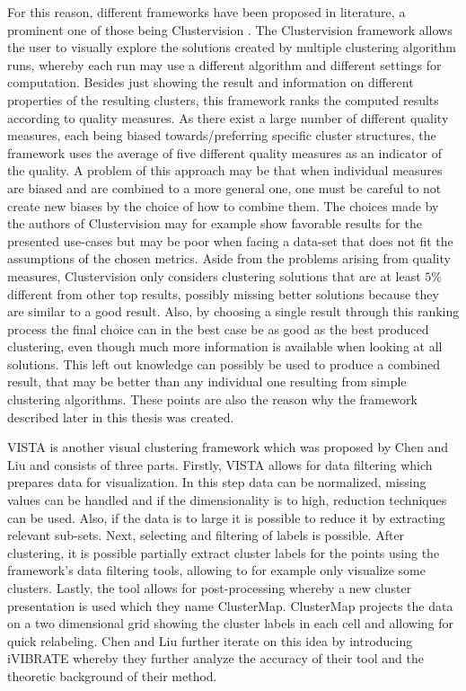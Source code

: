 \documentclass[
	a4paper,
	english,
	twoside,
	openright,               
	11pt                            
	]{report}
\begin{document}
For this reason, different frameworks have been proposed in literature, a prominent one of those being Clustervision \cite{Kwon2018ClustervisionVS}. The Clustervision framework allows the user to visually explore the solutions created by multiple clustering algorithm runs, whereby each run may use a different algorithm and different settings for computation. Besides just showing the result and information on different properties of the resulting clusters, this framework ranks the computed results according to quality measures. As there exist a large number of different quality measures, each being biased towards/preferring specific cluster structures, the framework uses the average of five different quality measures as an indicator of the quality. A problem of this approach may be that when individual measures are biased and are combined to a more general one, one must be careful to not create new biases by the choice of how to combine them. The choices made by the authors of Clustervision \cite{Kwon2018ClustervisionVS} may for example show favorable results for the presented use-cases but may be poor when facing a data-set that does not fit the assumptions of the chosen metrics. Aside from the problems arising from quality measures, Clustervision only considers clustering solutions that are at least $5\%$ different from other top results, possibly missing better solutions because they are similar to a good result. Also, by choosing a single result through this ranking process the final choice can in the best case be as good as the best produced clustering, even though much more information is available when looking at all solutions. This left out knowledge can possibly be used to produce a combined result, that may be better than any individual one resulting from simple clustering algorithms. These points are also the reason why the framework described later in this thesis was created.

VISTA \cite{VISTA} is another visual clustering framework which was proposed by Chen and Liu and consists of three parts. Firstly, VISTA allows for data filtering which prepares data for visualization. In this step data can be normalized, missing values can be handled and if the dimensionality is to high, reduction techniques can be used. Also, if the data is to large it is possible to reduce it by extracting relevant sub-sets. Next, selecting and filtering of labels is possible. After clustering, it is possible partially extract cluster labels for the points using the framework's data filtering tools, allowing to for example only visualize some clusters. Lastly, the tool allows for post-processing whereby a new cluster presentation is used which they name ClusterMap. ClusterMap projects the data on a two dimensional grid showing the cluster labels in each cell and allowing for quick relabeling. Chen and Liu further iterate on this idea by introducing iVIBRATE \cite{10.1145/1148020.1148024} whereby they further analyze the accuracy of their tool and the theoretic background of their method.
\end{document}
